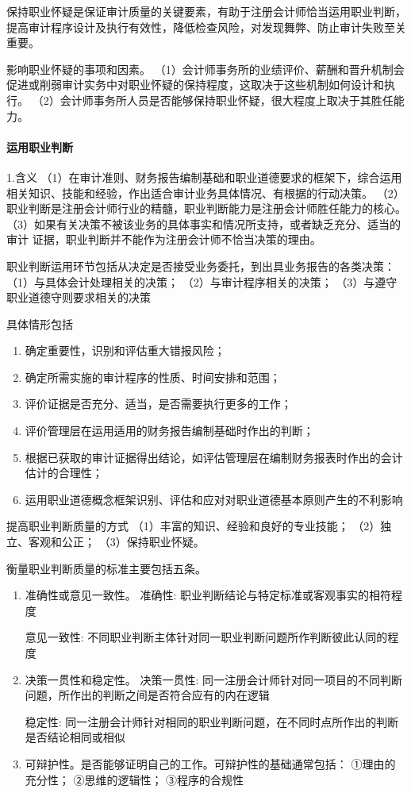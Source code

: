 \documentclass[UTF8,12pt]{ctexart}
\numberwithin{equation}{section} %
\numberwithin{figure}{section}
\numberwithin{table}{section}
\begin{document}
	保持职业怀疑是保证审计质量的关键要素，有助于注册会计师恰当运用职业判断，提高审计程序设计及执行有效性，降低检查风险，对发现舞弊、防止审计失败至关重要。
	
	影响职业怀疑的事项和因素。
	（1）会计师事务所的业绩评价、薪酬和晋升机制会促进或削弱审计实务中对职业怀疑的保持程度，这取决于这些机制如何设计和执行。
	（2）会计师事务所人员是否能够保持职业怀疑，很大程度上取决于其胜任能力。
	
	\paragraph{运用职业判断}
	1.含义
	（1）在审计准则、财务报告编制基础和职业道德要求的框架下，综合运用相关知识、技能和经验，作出适合审计业务具体情况、有根据的行动决策。
	（2）职业判断是注册会计师行业的精髓，职业判断能力是注册会计师胜任能力的核心。
	（3）如果有关决策不被该业务的具体事实和情况所支持，或者缺乏充分、适当的审计
	证据，职业判断并不能作为注册会计师不恰当决策的理由。
	
	职业判断运用环节包括从决定是否接受业务委托，到出具业务报告的各类决策：
	（1）与具体会计处理相关的决策；
	（2）与审计程序相关的决策；
	（3）与遵守职业道德守则要求相关的决策
	
	具体情形包括
	\begin{enumerate}
		\item 确定重要性，识别和评估重大错报风险；

		\item 确定所需实施的审计程序的性质、时间安排和范围；

		\item 评价证据是否充分、适当，是否需要执行更多的工作；

		\item 评价管理层在运用适用的财务报告编制基础时作出的判断；

		\item 根据已获取的审计证据得出结论，如评估管理层在编制财务报表时作出的会计估计的合理性；

		\item 运用职业道德概念框架识别、评估和应对对职业道德基本原则产生的不利影响
	\end{enumerate}
	
	提高职业判断质量的方式
	（1）丰富的知识、经验和良好的专业技能；
	（2）独立、客观和公正；
	（3）保持职业怀疑。
	
	衡量职业判断质量的标准主要包括五条。
	\begin{enumerate}
		\item 准确性或意见一致性。
		准确性:
		职业判断结论与特定标准或客观事实的相符程度
		
		意见一致性:
		不同职业判断主体针对同一职业判断问题所作判断彼此认同的程度
		
		\item 决策一贯性和稳定性。
		决策一贯性:
		同一注册会计师针对同一项目的不同判断问题，所作出的判断之间是否符合应有的内在逻辑
		
		稳定性:
		同一注册会计师针对相同的职业判断问题，在不同时点所作出的判断是否结论相同或相似
		
		\item 可辩护性。是否能够证明自己的工作。可辩护性的基础通常包括：
		①理由的充分性；
		②思维的逻辑性；
		③程序的合规性
	\end{enumerate}
\end{document}
